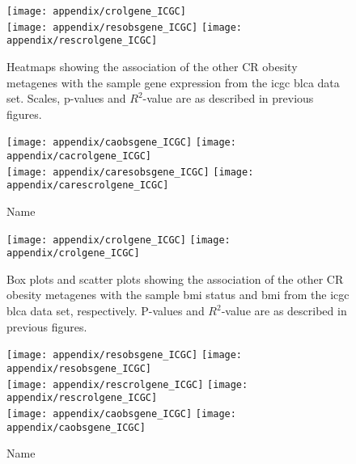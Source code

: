 \begin{appendices}
	\begin{figure}[htp!]
		\centering
		\texttt{[image: appendix/crolgene\_ICGC]}\\
		\vspace{1em}
		\texttt{[image: appendix/resobsgene\_ICGC]}
		\hfill
		\texttt{[image: appendix/rescrolgene\_ICGC]}\\
		\caption{Heatmaps showing the association of the other CR obesity metagenes with the sample gene expression from the \gls{icgc} \gls{blca} data set.
		Scales, p-values and $R^2$-value are as described in previous figures.}
		\label{fig:degmetaicgc_blca}
	\end{figure}

	\begin{figure}[htpb]
		\ContinuedFloat
		\captionsetup{list=off,format=cont}
		\centering
		\texttt{[image: appendix/caobsgene\_ICGC]}
		\hfill
		\texttt{[image: appendix/cacrolgene\_ICGC]}\\
		\texttt{[image: appendix/caresobsgene\_ICGC]}
		\hfill
		\texttt{[image: appendix/carescrolgene\_ICGC]}\\
		\caption{Name}
	\end{figure}

	\begin{figure}[htpb]
		\centering
		\texttt{[image: appendix/crolgene\_ICGC]}
		\hfill
		\texttt{[image: appendix/crolgene\_ICGC]}\\
		\caption{Box plots and scatter plots showing the association of the other CR obesity metagenes with the sample \gls{bmi} status  and \gls{bmi} from the \gls{icgc} \gls{blca} data set, respectively.
	P-values and $R^2$-value are as described in previous figures.}
		\label{fig:appendix/cr_ob_meta_box_scatter_blca}
	\end{figure}

	\begin{figure}[htpb]
		\ContinuedFloat
		\captionsetup{list=off,format=cont}
		\centering
		\texttt{[image: appendix/resobsgene\_ICGC]}
		\hfill
		\texttt{[image: appendix/resobsgene\_ICGC]}\\
		\texttt{[image: appendix/rescrolgene\_ICGC]}
		\hfill
		\texttt{[image: appendix/rescrolgene\_ICGC]}\\
		\texttt{[image: appendix/caobsgene\_ICGC]}
		\hfill
		\texttt{[image: appendix/caobsgene\_ICGC]}\\
		\caption{Name}
	\end{figure}


\end{appendices}
